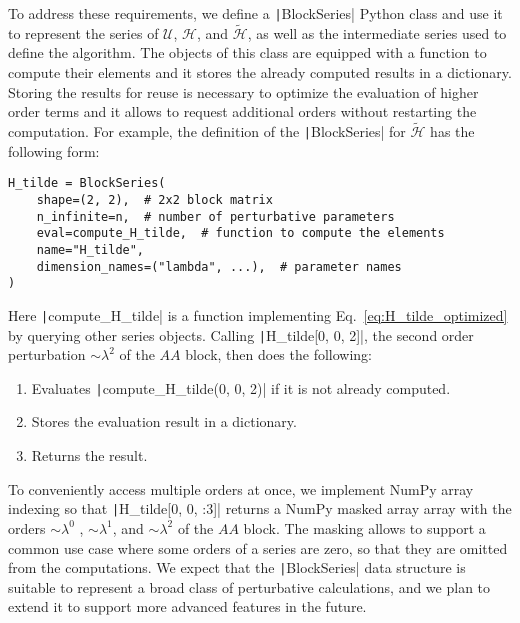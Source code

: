 To address these requirements, we define a \texttt|BlockSeries| Python class and use it to represent the series of $\mathcal{U}$, $\mathcal{H}$, and $\tilde{\mathcal{H}}$, as well as the intermediate series used to define the algorithm.
The objects of this class are equipped with a function to compute their elements and it stores the already computed results in a dictionary.
Storing the results for reuse is necessary to optimize the evaluation of higher order terms and it allows to request additional orders without restarting the computation.
For example, the definition of the \texttt|BlockSeries| for $\tilde{\mathcal{H}}$ has the following form:
%
\begin{verbatim}
H_tilde = BlockSeries(
    shape=(2, 2),  # 2x2 block matrix
    n_infinite=n,  # number of perturbative parameters
    eval=compute_H_tilde,  # function to compute the elements
    name="H_tilde",
    dimension_names=("lambda", ...),  # parameter names
)
\end{verbatim}
%
Here \texttt|compute_H_tilde| is a function implementing Eq.~\eqref{eq:H_tilde_optimized} by querying other series objects.
Calling \texttt|H_tilde[0, 0, 2]|, the second order perturbation $\sim \lambda^2$ of the $AA$ block, then does the following:
\begin{enumerate}
    \item Evaluates \texttt|compute_H_tilde(0, 0, 2)| if it is not already computed.
    \item Stores the evaluation result in a dictionary.
    \item Returns the result.
\end{enumerate}
To conveniently access multiple orders at once, we implement NumPy array indexing so that \texttt|H_tilde[0, 0, :3]| returns a NumPy masked array array with the orders $\sim \lambda^0$ , $\sim \lambda^1$, and $\sim \lambda^2$ of the $AA$ block.
The masking allows to support a common use case where some orders of a series are zero, so that they are omitted from the computations.
We expect that the \texttt|BlockSeries| data structure is suitable to represent a broad class of perturbative calculations, and we plan to extend it to support more advanced features in the future.

